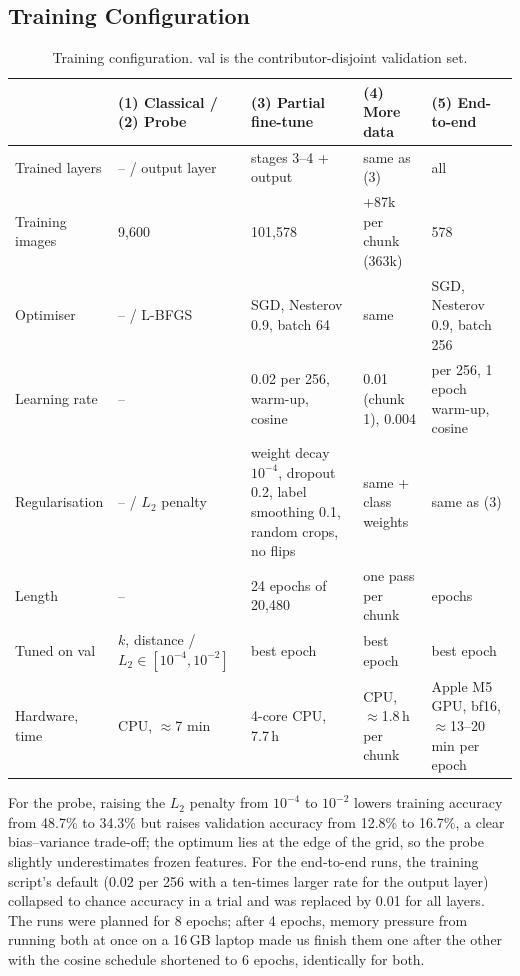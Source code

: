 \documentclass[clean,twocolumn]{bam-project}
\begin{document}
\subsection{Training Configuration}
\begin{table}[!t]
\centering\small
\caption{Training configuration. val is the contributor-disjoint validation set.}
\label{tab:config}
\begin{tabularx}{\textwidth}{@{}l>{\raggedright}X>{\raggedright}X>{\raggedright}X>{\raggedright\arraybackslash}X@{}}
\toprule
 & (1) Classical / (2) Probe & (3) Partial fine-tune & (4) More data & (5) End-to-end \\
\midrule
Trained layers & -- / output layer & stages 3--4 + output & same as (3) & all \\
Training images & 9{,}600 & 101{,}578 & +87k per chunk (363k) & 101{,}578 \\
Optimiser & -- / L-BFGS & SGD, Nesterov 0.9, batch 64 & same & SGD, Nesterov 0.9, batch 256 \\
Learning rate & -- & 0.02 per 256, warm-up, cosine & 0.01 (chunk 1), 0.004 & 0.01 per 256, 1 epoch warm-up, cosine \\
Regularisation & -- / $L_2$ penalty & weight decay $10^{-4}$, dropout 0.2, label smoothing 0.1, random crops, no flips & same + class weights & same as (3) \\
Length & -- & 24 epochs of 20{,}480 & one pass per chunk & 6 epochs \\
Tuned on val & $k$, distance / $L_2\in[10^{-4},10^{-2}]$ & best epoch & best epoch & best epoch \\
Hardware, time & CPU, $\approx$7 min & 4-core CPU, 7.7\,h & CPU, $\approx$1.8\,h per chunk & Apple M5 GPU, bf16, $\approx$13--20 min per epoch \\
\bottomrule
\end{tabularx}
\end{table}

For the probe, raising the $L_2$ penalty from $10^{-4}$ to $10^{-2}$ lowers training accuracy from 48.7\%
to 34.3\% but raises validation accuracy from 12.8\% to 16.7\%, a clear bias--variance trade-off; the
optimum lies at the edge of the grid, so the probe slightly underestimates frozen features. For the
end-to-end runs, the training script's default (0.02 per 256 with a ten-times larger rate for the output
layer) collapsed to chance accuracy in a trial and was replaced by 0.01 for all layers. The runs were
planned for 8 epochs; after 4 epochs, memory pressure from running both at once on a 16\,GB laptop made
us finish them one after the other with the cosine schedule shortened to 6 epochs, identically for both.
\end{document}
